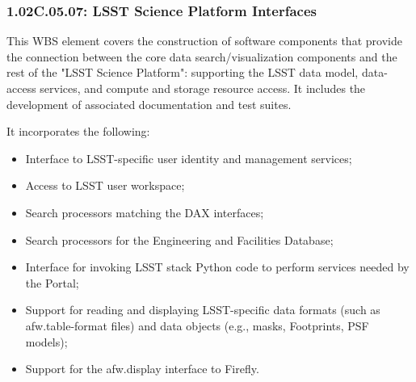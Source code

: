 \subsubsection{1.02C.05.07: LSST Science Platform Interfaces}

This WBS element covers the construction of software components that provide the connection between the core data search/visualization components and the rest of the "LSST Science Platform": supporting the LSST data model, data-access services, and compute and storage resource access. It includes the development of associated documentation and test suites.

It incorporates the following:
\begin{itemize}

\item{Interface to LSST-specific user identity and management services;}
\item{Access to LSST user workspace;}
\item{Search processors matching the DAX interfaces;}
\item{Search processors for the Engineering and Facilities Database;}
\item{Interface for invoking LSST stack Python code to perform services needed by the Portal;}
\item{Support for reading and displaying LSST-specific data formats (such as afw.table-format files) and data objects (e.g., masks, Footprints, PSF models);}
\item{Support for the afw.display interface to Firefly.}
\end{itemize}


